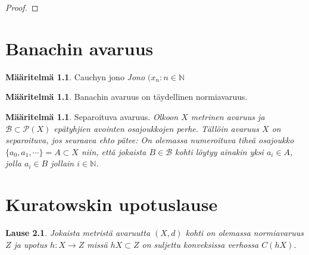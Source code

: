 \documentclass[12pt,a4paper,leqno]{report}
\newcommand{\N}{\mathbb{N}}
\theoremstyle{plain}
\newtheorem{lause}[equation]{Lause}
\theoremstyle{definition}
\newtheorem{maar}[equation]{Määritelmä}
\theoremstyle{remark}
\begin{document}
\begin{proof}

\end{proof}

\chapter{Banachin avaruus}\label{Banach}

\begin{maar}Cauchyn jono \emph{
Jono $(x_n\colon n\in \N$
}
\end{maar}

\begin{maar}Banachin avaruus on täydellinen normiavaruus.
\end{maar}

\begin{maar}Separoituva avaruus. \emph{Olkoon $X$ metrinen avaruus ja $\mathcal{B}\subset \mathcal{P}( X)$ epätyhjien avointen osajoukkojen perhe. Tällöin avaruus $X$ on separoituva, jos seuraava ehto pätee: On olemassa numeroituva tiheä osajoukko $\{a_0,a_1,\cdots\}=A\subset X$ niin, että jokaista $B\in\mathcal{B}$ kohti löytyy ainakin yksi $a_i\in A$, jolla $a_i\in B$ jollain $i\in \N$.}
\end{maar}


\chapter{Kuratowskin upotuslause}\label{kuratowski}

\begin{lause}
Jokaista metristä avaruutta $(X,d)$ kohti on olemassa normiavaruus $Z$ ja upotus $h\colon X\rightarrow Z$ missä $ hX\subset Z$ on suljettu konveksissa verhossa $C(hX)$. 
\end{lause} 
 
\end{document}

